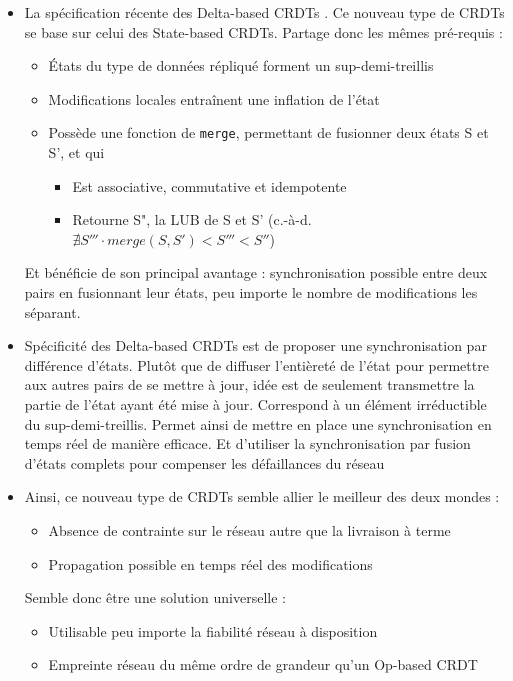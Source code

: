 \documentclass[12pt]{thesul}
\theoremstyle{definition}
\newcommand{\ie}{c.-à-d.\xspace}
\begin{document}
\begin{itemize}
  \item La spécification récente des Delta-based CRDTs .
    Ce nouveau type de CRDTs se base sur celui des State-based CRDTs.
    Partage donc les mêmes pré-requis :
    \begin{itemize}
      \item États du type de données répliqué forment un sup-demi-treillis
      \item Modifications locales entraînent une inflation de l'état
      \item Possède une fonction de \texttt{merge}, permettant de fusionner deux états S et S', et qui
      \begin{itemize}
        \item Est associative, commutative et idempotente
        \item Retourne S", la \ac{LUB} de S et S' (\ie $\nexists S''' \cdot merge(S, S') < S''' < S''$)
      \end{itemize}
    \end{itemize}
    Et bénéficie de son principal avantage : synchronisation possible entre deux pairs en fusionnant leur états, peu importe le nombre de modifications les séparant.
  \item Spécificité des Delta-based CRDTs est de proposer une synchronisation par différence d'états.
    Plutôt que de diffuser l'entièreté de l'état pour permettre aux autres pairs de se mettre à jour, idée est de seulement transmettre la partie de l'état ayant été mise à jour.
    Correspond à un élément irréductible du sup-demi-treillis.
    Permet ainsi de mettre en place une synchronisation en temps réel de manière efficace.
    Et d'utiliser la synchronisation par fusion d'états complets pour compenser les défaillances du réseau
  \item Ainsi, ce nouveau type de CRDTs semble allier le meilleur des deux mondes :
    \begin{itemize}
      \item Absence de contrainte sur le réseau autre que la livraison à terme
      \item Propagation possible en temps réel des modifications
    \end{itemize}
    Semble donc être une solution universelle :
    \begin{itemize}
      \item Utilisable peu importe la fiabilité réseau à disposition
      \item Empreinte réseau du même ordre de grandeur qu'un Op-based CRDT

\end{itemize}
\end{itemize}
\end{document}
